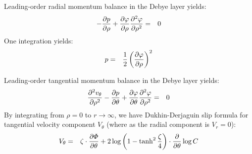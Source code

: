 Leading-order radial momentum balance in the Debye layer yields:
\begin{eqnarray}
- \frac{\partial p}{\partial \rho} + \frac{\partial \varphi}{\partial \rho} \frac{\partial ^2\varphi}{\partial \rho^2} &=& 0
\end{eqnarray}
One integration yields:
\begin{eqnarray}
p &=& \frac{1}{2}\left(\frac{\partial \varphi}{\partial \rho}\right)^2
\end{eqnarray}

Leading-order tangential momentum balance in the Debye layer yields:
\begin{eqnarray}
\frac{\partial ^2 v_\theta}{\partial \rho^2} - \frac{\partial p}{\partial \theta} 
 + \frac{\partial \varphi}{\partial \theta} \frac{\partial ^2\varphi}{\partial \rho^2} &=& 0
\end{eqnarray}
By integrating from $\rho = 0$ to $r \rightarrow \infty$, we have Dukhin-Derjaguin slip formula
for tangential velocity component $V_\theta$ (where as the radial component is $V_r = 0$):
\begin{eqnarray}
V_\theta &=& \zeta \cdot \frac{\partial \varPhi}{\partial \theta} + 
      2\log\left(1 - \tanh^2 \frac{\zeta}{4}\right) \cdot \frac{\partial }{\partial \theta} \log C
\end{eqnarray}

